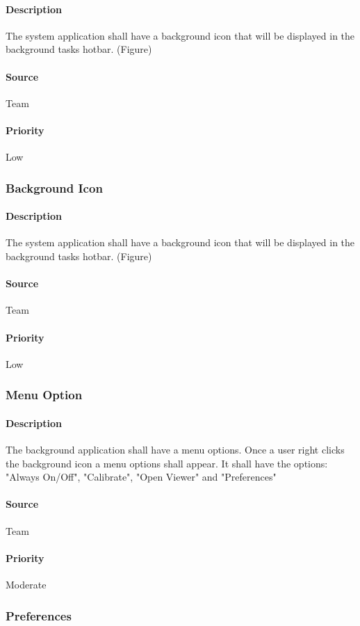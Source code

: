 \paragraph{Description}
The system application shall have a background icon that will be displayed in the background tasks hotbar. (Figure)
\paragraph{Source}
Team
\paragraph{Priority}
Low
\subsubsection{Background Icon}
\paragraph{Description}
The system application shall have a background icon that will be displayed in the background tasks hotbar. (Figure)
\paragraph{Source}
Team
\paragraph{Priority}
Low
\subsubsection{Menu Option}
\paragraph{Description}
The background application shall have a menu options. Once a user right clicks the background icon a menu options shall appear. It shall have the options: "Always On/Off", "Calibrate", "Open Viewer" and "Preferences"
\paragraph{Source}
Team
\paragraph{Priority}
Moderate
\subsubsection{Preferences}
